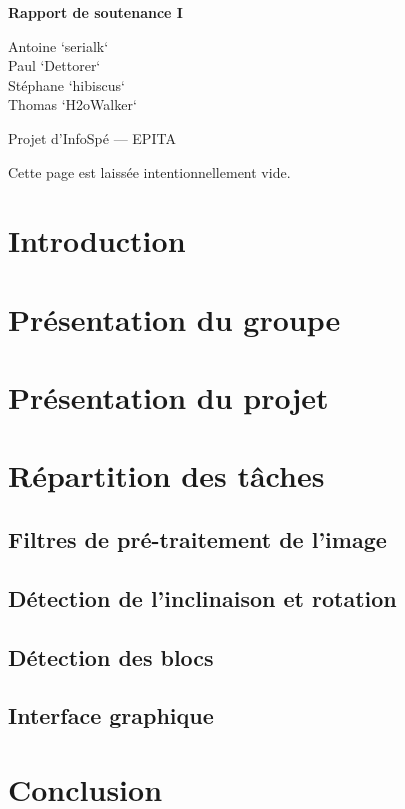 \documentclass[12pt,a4paper]{article}
\newcommand{\subtitle}{Rapport de soutenance I}
\begin{document}
\begin{titlepage}
\begin{center}
\vspace{8cm}
\vspace{0.5cm}

\LARGE{\textbf{\subtitle}}
\vspace{1cm}

\large{\textsf{
Antoine `serialk`  \\
Paul `Dettorer`  \\
Stéphane `hibiscus`  \\
Thomas `H2oWalker` }}
\vspace{2cm}

\large{\textsf{Projet d'InfoSpé --- EPITA}}
\end{center}
\end{titlepage}

\newpage
Cette page est laissée intentionnellement vide.

\newpage
\setcounter{tocdepth}{3}
\tableofcontents

\newpage
\pagestyle{headings}
\section{Introduction}

\section{Présentation du groupe}


\newpage
\section{Présentation du projet}


\newpage
\section{Répartition des tâches}
\subsection{Filtres de pré-traitement de l'image}

\newpage
\subsection{Détection de l'inclinaison et rotation}

\newpage
\subsection{Détection des blocs}

\newpage
\subsection{Interface graphique}


\newpage
\section{Conclusion}

\end{document}

